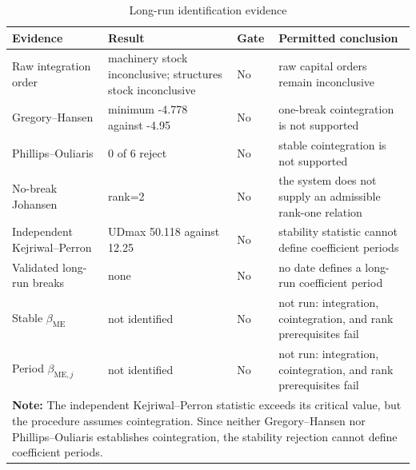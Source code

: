 \begin{table}[h!]
\centering\small
\caption{Long-run identification evidence}
\label{tab:long-run}
\begin{tabular}{p{3.0cm}p{3.25cm}p{1.5cm}p{5.2cm}}
\toprule
\textbf{Evidence} & \textbf{Result} & \textbf{Gate} & \textbf{Permitted conclusion}\\
\midrule
Raw integration order & machinery stock inconclusive; structures stock inconclusive & No & raw capital orders remain inconclusive \\
Gregory--Hansen & minimum -4.778 against -4.95 & No & one-break cointegration is not supported \\
Phillips--Ouliaris & 0 of 6 reject & No & stable cointegration is not supported \\
No-break Johansen & rank=2 & No & the system does not supply an admissible rank-one relation \\
Independent Kejriwal--Perron & UDmax 50.118 against 12.25 & No & stability statistic cannot define coefficient periods \\
Validated long-run breaks & none & No & no date defines a long-run coefficient period \\
Stable $\beta_{\mathrm{ME}}$ & not identified & No & not run: integration, cointegration, and rank prerequisites fail \\
Period $\beta_{\mathrm{ME},j}$ & not identified & No & not run: integration, cointegration, and rank prerequisites fail \\
\bottomrule
\multicolumn{4}{p{13.1cm}}{\footnotesize \textbf{Note:} The independent Kejriwal--Perron statistic exceeds its critical value, but the procedure assumes cointegration. Since neither Gregory--Hansen nor Phillips--Ouliaris establishes cointegration, the stability rejection cannot define coefficient periods.}
\end{tabular}
\end{table}
